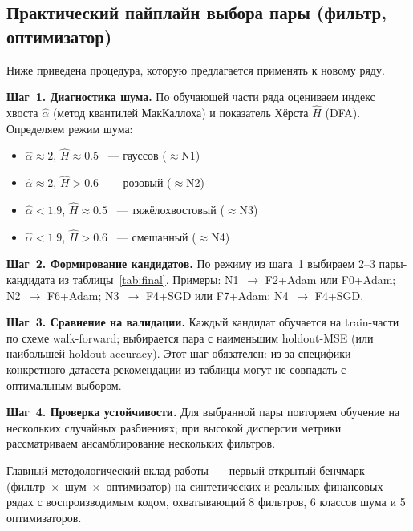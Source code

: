 \documentclass[conference]{IEEEtran}
\begin{document}

\subsection{Практический пайплайн выбора пары (фильтр, оптимизатор)}

Ниже приведена процедура, которую предлагается применять к новому ряду.

\textbf{Шаг~1. Диагностика шума.} По обучающей части ряда оцениваем
индекс хвоста $\hat{\alpha}$ (метод квантилей МакКаллоха) и показатель
Хёрста $\hat{H}$ (DFA). Определяем режим шума:
\begin{itemize}
  \item $\hat{\alpha}\approx2$, $\hat{H}\approx0.5$ ~--- гауссов ($\approx$N1)
  \item $\hat{\alpha}\approx2$, $\hat{H}>0.6$ ~--- розовый ($\approx$N2)
  \item $\hat{\alpha}<1.9$, $\hat{H}\approx0.5$ ~--- тяжёлохвостовый ($\approx$N3)
  \item $\hat{\alpha}<1.9$, $\hat{H}>0.6$ ~--- смешанный ($\approx$N4)
\end{itemize}

\textbf{Шаг~2. Формирование кандидатов.} По режиму из шага~1 выбираем
2--3 пары-кандидата из таблицы~\ref{tab:final}. Примеры:
N1~$\to$ F2+Adam или F0+Adam;
N2~$\to$ F6+Adam;
N3~$\to$ F4+SGD или F7+Adam;
N4~$\to$ F4+SGD.

\textbf{Шаг~3. Сравнение на валидации.} Каждый кандидат обучается на
train-части по схеме walk-forward; выбирается пара с наименьшим
holdout-MSE (или наибольшей holdout-accuracy). Этот шаг обязателен:
из-за специфики конкретного датасета рекомендации из таблицы могут не
совпадать с оптимальным выбором.

\textbf{Шаг~4. Проверка устойчивости.} Для выбранной пары повторяем
обучение на нескольких случайных разбиениях; при высокой дисперсии
метрики рассматриваем ансамблирование нескольких фильтров.

Главный методологический вклад работы~--- первый открытый бенчмарк
(фильтр~$\times$~шум~$\times$~оптимизатор) на синтетических и реальных
финансовых рядах с воспроизводимым кодом, охватывающий 8 фильтров,
6 классов шума и 5 оптимизаторов.
\end{document}
